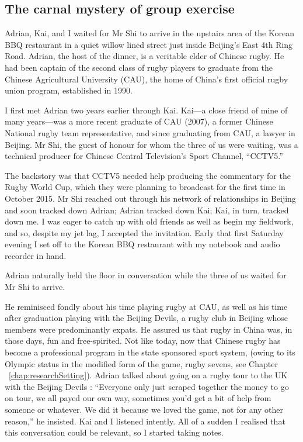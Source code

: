                                           \begin{CJK}{UTF8}{gbsn}

\section{The carnal mystery of group exercise \label{sect:adrian}}

Adrian, Kai, and I waited for Mr Shi to arrive in the upstairs area of the Korean BBQ restaurant in a quiet willow lined street just inside Beijing's East 4th Ring Road.  Adrian, the host of the dinner, is a veritable elder of Chinese rugby.  He had been captain of the second class of rugby players to graduate from the Chinese Agricultural University (CAU), the home of China's first official rugby union program, established in 1990.

I first met Adrian two years earlier through Kai. Kai---a close friend of mine of many years---was a more recent graduate of CAU (2007), a former Chinese National rugby team representative, and since graduating from CAU, a lawyer in Beijing.  Mr Shi, the guest of honour for whom the three of us were waiting, was a technical producer for Chinese Central Television's Sport Channel, ``CCTV5.''

The backstory was that CCTV5 needed help producing the commentary for the Rugby World Cup, which they were planning to broadcast for the first time in October 2015.  Mr Shi reached out through his network of relationships in Beijing and soon tracked down Adrian; Adrian tracked down Kai; Kai, in turn, tracked down me.  I was eager to catch up with old friends as well as begin my fieldwork, and so, despite my jet lag, I accepted the invitation. Early that first Saturday evening I set off to the Korean BBQ restaurant with my notebook and audio recorder in hand.

Adrian naturally held the floor in conversation while the three of us waited for Mr Shi to arrive.



He reminisced fondly about his time playing rugby at CAU, as well as his time after graduation playing with the Beijing Devils, a rugby club in Beijing whose members were predominantly expats.  He assured us that rugby in China was, in those days, fun and free-spirited.  Not like today, now that Chinese rugby has become a professional program in the state sponsored sport system, (owing to its Olympic status in the modified form of the game, rugby sevens, see Chapter ~\ref{chap:researchSetting}).  Adrian talked about going on a rugby tour to the UK with the Beijing Devils :  ``Everyone only just scraped together the money to go on tour, we all payed our own way, sometimes you'd get a bit of help from someone or whatever. We did it because we loved the game, not for any other reason,'' he insisted.  Kai and I listened intently.  All of a sudden I realised that this conversation could be relevant, so I started taking notes.


\end{CJK}
